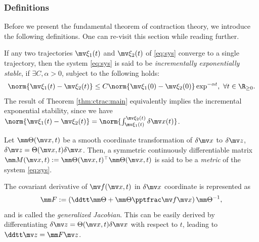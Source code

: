 \subsubsection{Definitions}

Before we present the fundamental theorem of contraction theory, we introduce the following definitions.
One can re-visit this section while reading further.

\begin{definition}  
    If any two trajectories $\mv\xi_1(t)$ and $\mv\xi_2(t)$ of \eqref{eq:sys} converge to a single trajectory, then the system \eqref{eq:sys} is said to be \textit{incrementally exponentially stable}, if $\exists C,\alpha>0$, subject to the following holds:
    \begin{equation}      
        \norm{\mv\xi_1(t)-\mv\xi_2(t)}
        \le 
        C
        \norm{\mv\xi_1(0)-\mv\xi_2(0)}
        \exp^{-\alpha t}
        ,\ \forall t\in\R_{\ge 0}
        .
    \end{equation}
    The result of Theorem \ref{thm:ctrac:main} equivalently implies the incremental exponential stability, since we have $\norm{\mv\xi_1(t)-\mv\xi_2(t)}= \norm{\int_{\mv\xi_1(t)}^{\mv\xi_2(t)}\delta\bdx(t)}$.
    \label{def:inc_exp_stable}
\end{definition}

\begin{definition}
    Let $\mm\Theta(\bdx,t)$ be a smooth coordinate transformation of $\delta\bdx$ to $\delta\bdz$, \ie $\delta\bdz = \Theta(\bdx,t)\delta\bdx$.
    Then, a symmetric continuously differentiable matrix $\mm M(\bdx,t):=\mm\Theta(\bdx,t)^\top\mm\Theta(\bdx,t)$ is said to be a \textit{metric} of the system \eqref{eq:sys}.
    \label{def:metric}
\end{definition}

\begin{definition}
    The covariant derivative of $\mv f(\bdx,t)$ in $\delta\bdx$ coordinate is represented as 
    \begin{equation}
        \mm F
        :=
        \left(
            \ddtt\mm\Theta
            +
            \mm\Theta\tpfpx
        \right)
        \mm\Theta^{-1}
        ,
    \end{equation}
    and is called the \textit{generalized Jacobian}.
    This can be easily derived by differentiating $\delta\bdz = \Theta(\bdx,t)\delta\bdx$ with respect to $t$, leading to $\ddtt\bdz=\mm F\bdz$.
    \label{def:gen_jac}
\end{definition}

